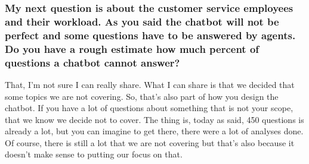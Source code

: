 \begin{appendices}
	\subsubsection{My next question is about the customer service employees and their workload. As you said the chatbot will not be perfect and some questions have to be answered by agents. Do you have a rough estimate how much percent of questions a chatbot cannot answer?}
	That, I’m not sure I can really share. What I can share is that we decided that some topics we are not covering. So, that’s also part of how you design the chatbot. If you have a lot of questions about something that is not your scope, that we know we decide not to cover. The thing is, today as said, 450 questions is already a lot, but you can imagine to get there, there were a lot of analyses done. Of course, there is still a lot that we are not covering but that’s also because it doesn’t make sense to putting our focus on that.
	

\end{appendices}
